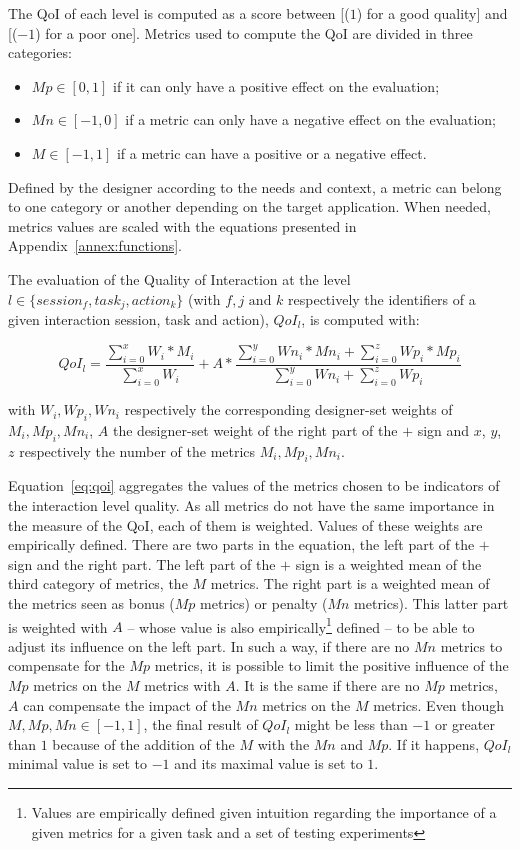 \documentclass[a4paper,11pt,twoside]{StyleThese}
\begin{document}
The QoI of each level is computed as a score between [($1$) for a good quality] and [($-1$) for a poor one]. Metrics used to compute the QoI are divided in three categories: 
\begin{itemize}
	\item $Mp \in [0,1]$ if it can only have a positive effect on the evaluation;
	\item $Mn \in [-1,0]$ if a metric can only have a negative effect on the evaluation;
	\item $M \in [-1,1]$ if a metric can have a positive or a negative effect.
\end{itemize}

Defined by the designer according to the needs and context, a metric can belong to one category or another depending on the target application. When needed, metrics values are scaled with the equations presented in Appendix~\ref{annex:functions}.

The evaluation of the Quality of Interaction at the level $l \in \{session_f,task_j,action_k\}$ (with $f,j \text{ and }k$ respectively the identifiers of a given interaction session, task and action),  $QoI_l$, is computed with:

\begin{equation}\label{eq:qoi}
QoI_{l}= \frac{ \sum\limits_{i=0}^x W_i * M_i}{\sum\limits_{i=0}^x W_i} + A * \frac{ \sum\limits_{i=0}^y Wn_i * Mn_i  + \sum\limits_{i=0}^z Wp_i * Mp_i}{\sum\limits_{i=0}^y Wn_i+\sum\limits_{i=0}^z Wp_i} 
\end{equation}


with $W_i, Wp_i,Wn_i$ respectively the corresponding designer-set weights of $M_i, Mp_i, Mn_i$, $A$ the designer-set weight of the right part of the $+$ sign and $x$, $y$, $z$ respectively the number of the metrics $M_i, Mp_i, Mn_i$.

Equation~\ref{eq:qoi} aggregates the values of the metrics chosen to be indicators of the interaction level quality. As all metrics do not have the same importance in the measure of the QoI, each of them is weighted. Values of these weights are empirically defined. There are two parts in the equation, the left part of the $+$ sign and the right part. The left part of the $+$ sign is a weighted mean of the third category of metrics, the $M$ metrics. The right part is a weighted mean of the metrics seen as bonus (\ie $Mp$ metrics) or penalty (\ie $Mn$ metrics). This latter part is weighted with $A$ -- whose value is also empirically\footnote{Values are empirically defined given intuition regarding the importance of a given metrics for a given task and a set of testing experiments} defined -- to be able to adjust its influence on the left part. In such a way, if there are no $Mn$ metrics to compensate for the $Mp$ metrics, it is possible to limit the positive influence of the $Mp$ metrics on the $M$ metrics with $A$. It is the same if there are no $Mp$ metrics, $A$ can compensate the impact of the $Mn$ metrics on the $M$ metrics. Even though $M, Mp, Mn \in [-1,1]$, the final result of $QoI_l$ might be less than $-1$ or greater than $1$ because of the addition of the $M$ with the $Mn$ and $Mp$. If it happens, $QoI_l$ minimal value is set to $-1$ and its maximal value is set to $1$.
\end{document}
